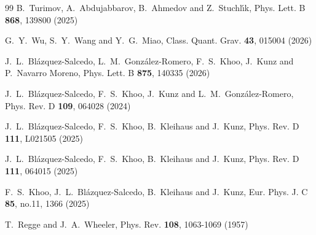 \documentclass[11pt,a4paper]{article}
\begin{document}
\begin{thebibliography}{99}
B.~Turimov, A.~Abdujabbarov, B.~Ahmedov and Z.~Stuchl{\'\i}k,
Phys. Lett. B \textbf{868}, 139800 (2025)


G.~Y.~Wu, S.~Y.~Wang and Y.~G.~Miao,
Class. Quant. Grav. \textbf{43}, 015004 (2026)

J.~L.~Bl{\'a}zquez-Salcedo, L.~M.~Gonz{\'a}lez-Romero, F.~S.~Khoo, J.~Kunz and P.~Navarro Moreno,
Phys. Lett. B \textbf{875}, 140335 (2026)

J.~L.~Bl\'azquez-Salcedo, F.~S.~Khoo, J.~Kunz and L.~M.~Gonz\'alez-Romero,
Phys. Rev. D \textbf{109}, 064028 (2024)

J.~L.~Bl{\'a}zquez-Salcedo, F.~S.~Khoo, B.~Kleihaus and J.~Kunz,
Phys. Rev. D \textbf{111}, L021505 (2025)

J.~L.~Bl{\'a}zquez-Salcedo, F.~S.~Khoo, B.~Kleihaus and J.~Kunz,
Phys. Rev. D \textbf{111}, 064015 (2025)

F.~S.~Khoo, J.~L.~Bl{\'a}zquez-Salcedo, B.~Kleihaus and J.~Kunz,
Eur. Phys. J. C \textbf{85}, no.11, 1366 (2025)


T.~Regge and J.~A.~Wheeler,
Phys. Rev. \textbf{108}, 1063-1069 (1957)




\end{thebibliography}
\end{document}
